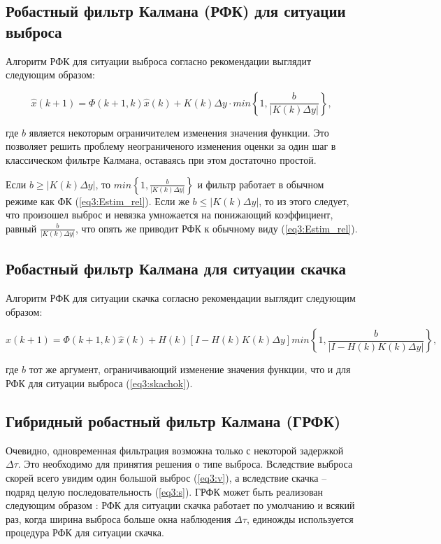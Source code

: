 \subsection{Робастный фильтр Калмана (РФК) для ситуации выброса} \label{sect3_5_1}
Алгоритм РФК для ситуации выброса согласно рекомендации \cite{RobustFilter} выглядит следующим образом:

\begin{equation}\label{eq3:skachok}
\hat{x}(k+1)=\Phi(k+1,k)\hat{x}(k)+K(k)\Delta y\cdot min\left\{1,\frac{b}{|K(k)\Delta y|}\right\},
\end{equation}

\noindent где $b$ является некоторым ограничителем изменения значения функции. 
Это позволяет решить проблему неограниченого изменения оценки за один шаг в классическом фильтре Калмана, оставаясь при этом достаточно простой.

Если $b\geq |K(k) \Delta y |$, то $min\left\{1,\frac{b}{|K(k)\Delta y|}\right\}$ и фильтр работает в обычном режиме как ФК (\ref{eq3:Estim_rel}). Если же $b\leq |K(k) \Delta y |$, то из этого следует, что произошел выброс и невязка умножается на понижающий коэффициент, равный $\frac{b}{|K(k)\Delta y|}$, что опять же приводит РФК к обычному виду (\ref{eq3:Estim_rel}).

\subsection{Робастный фильтр Калмана для ситуации скачка} \label{sect3_5_2}

Алгоритм РФК для ситуации скачка согласно рекомендации \cite{RobustFilter} выглядит следующим образом:

\begin{equation}\label{eq3:vibros}
\hat{x}(k+1)=\Phi(k+1,k)\hat{x}(k)+H(k)[I-H(k)K(k)\Delta y] min\left\{1,\frac{b}{|I-H(k)K(k)\Delta y|}\right\},
\end{equation}

\noindent где $b$ тот же аргумент, ограничивающий изменение значения функции, что и для РФК для ситуации выброса (\ref{eq3:skachok}).

\subsection{Гибридный робастный фильтр Калмана (ГРФК)} \label{sect3_5_3}

Очевидно, одновременная фильтрация возможна только с некоторой задержкой $\Delta \tau$. Это необходимо для принятия решения о типе выброса. Вследствие выброса скорей всего увидим один большой выброс (\ref{eq3:v}), а вследствие скачка – подряд целую последовательность (\ref{eq3:s}). ГРФК может быть реализован следующим образом \cite{RobustFilter}: РФК для ситуации скачка работает по умолчанию и всякий раз, когда ширина выброса больше окна наблюдения $\Delta \tau$, единожды используется процедура РФК для ситуации скачка.


